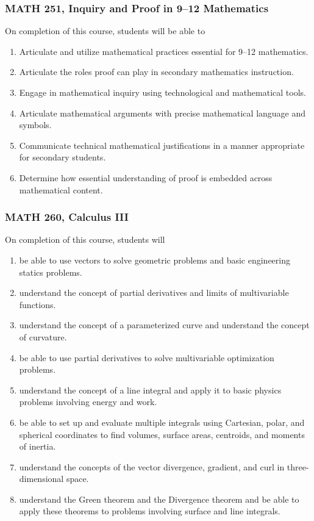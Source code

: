 \documentclass[11pt]{article}
\newenvironment{alphalist}{
\begin{enumerate}[label=(\arabic*),widest=107 ,leftmargin=25pt, itemsep=0pt]}
{\end{enumerate}}
\begin{document}
\subsubsection{MATH 251, Inquiry and Proof in 9--12 Mathematics}


On completion of this course, students will be able to
\begin{alphalist}
\item Articulate and utilize mathematical practices essential for 9--12 mathematics.  
\item Articulate the roles proof can play in secondary mathematics instruction.
\item Engage in mathematical inquiry using technological and mathematical tools.
\item Articulate mathematical arguments with precise mathematical language and symbols.
\item Communicate technical mathematical justifications in a manner appropriate for secondary students.
\item Determine how essential understanding of proof is embedded across mathematical content.
\end{alphalist}

\subsubsection{MATH 260, Calculus III}


On completion of this course, students will 
\begin{alphalist} 
    \item be able to use vectors to solve geometric problems and basic engineering statics problems.
    \item understand the concept of partial derivatives and limits of multivariable functions.
    \item understand the concept of a parameterized curve and understand the concept of curvature.
    \item be able to use partial derivatives to solve multivariable optimization problems.
    \item understand the concept of a line integral and apply it to basic physics problems involving energy and work.
    \item be able to set up and evaluate multiple integrals using Cartesian, polar, and spherical coordinates to find volumes, 
    surface areas, centroids, and moments of inertia.
    \item understand the concepts of the vector divergence, gradient, and curl in 
    three-dimensional space.
    \item understand the Green theorem and the Divergence theorem and be able to 
    apply these theorems to problems involving surface and line integrals.
\end{alphalist}
\end{document}
